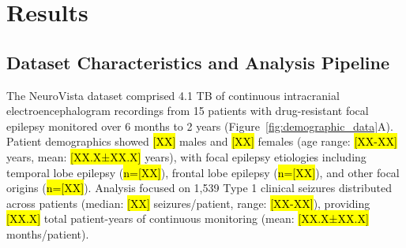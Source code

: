 \section{Results}


\subsection{Dataset Characteristics and Analysis Pipeline}
The NeuroVista dataset \cite{Kuhlmann2018SeizurePA} comprised 4.1 TB of continuous intracranial electroencephalogram recordings from 15 patients with drug-resistant focal epilepsy monitored over 6 months to 2 years (Figure~\ref{fig:demographic_data}A). Patient demographics showed \hl{[XX]} males and \hl{[XX]} females (age range: \hl{[XX-XX]} years, mean: \hl{[XX.X±XX.X]} years), with focal epilepsy etiologies including temporal lobe epilepsy (\hl{n=[XX]}), frontal lobe epilepsy (\hl{n=[XX]}), and other focal origins (\hl{n=[XX]}). Analysis focused on 1,539 Type 1 clinical seizures distributed across patients (median: \hl{[XX]} seizures/patient, range: \hl{[XX-XX]}), providing \hl{[XX.X]} total patient-years of continuous monitoring (mean: \hl{[XX.X±XX.X]} months/patient).


